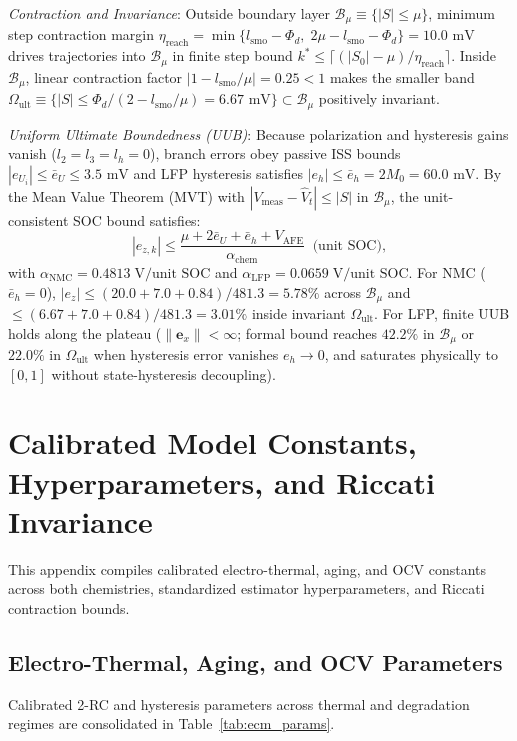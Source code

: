 \documentclass[11pt,a4paper]{article}
\begin{document}
\emph{Contraction and Invariance}: Outside boundary layer $\mathcal{B}_\mu \equiv \{|S| \le \mu\}$, minimum step contraction margin $\eta_{\text{reach}} = \min\{l_{\text{smo}} - \Phi_d,\; 2\mu - l_{\text{smo}} - \Phi_d\} = 10.0\text{ mV}$ drives trajectories into $\mathcal{B}_\mu$ in finite step bound $k^* \le \lceil (|S_0| - \mu)/\eta_{\text{reach}} \rceil$. Inside $\mathcal{B}_\mu$, linear contraction factor $|1 - l_{\text{smo}}/\mu| = 0.25 < 1$ makes the smaller band $\Omega_{\text{ult}} \equiv \{|S| \le \Phi_d/(2 - l_{\text{smo}}/\mu) = 6.67\text{ mV}\} \subset \mathcal{B}_\mu$ positively invariant.

\emph{Uniform Ultimate Boundedness (UUB)}: Because polarization and hysteresis gains vanish ($l_2 = l_3 = l_h = 0$), branch errors obey passive ISS bounds $|e_{U_i}| \le \bar{e}_U \le 3.5\text{ mV}$ and LFP hysteresis satisfies $|e_h| \le \bar{e}_h = 2 M_0 = 60.0\text{ mV}$. By the Mean Value Theorem (MVT) with $|V_{\text{meas}} - \hat{V}_t| \le |S|$ in $\mathcal{B}_\mu$, the unit-consistent SOC bound satisfies:
\begin{equation*}
|e_{z,k}| \le \frac{\mu + 2\bar{e}_U + \bar{e}_h + V_{\text{AFE}}}{\alpha_{\text{chem}}}\;\;\text{(unit SOC)},
\end{equation*}
with $\alpha_{\text{NMC}} = 0.4813\;\mathrm{V}/\text{unit SOC}$ and $\alpha_{\text{LFP}} = 0.0659\;\mathrm{V}/\text{unit SOC}$. For NMC ($\bar{e}_h = 0$), $|e_z| \le (20.0 + 7.0 + 0.84)/481.3 = 5.78\%$ across $\mathcal{B}_\mu$ and $\le (6.67 + 7.0 + 0.84)/481.3 = 3.01\%$ inside invariant $\Omega_{\text{ult}}$. For LFP, finite UUB holds along the plateau ($\|\mathbf{e}_x\| < \infty$; formal bound reaches $42.2\%$ in $\mathcal{B}_\mu$ or $22.0\%$ in $\Omega_{\text{ult}}$ when hysteresis error vanishes $e_h \to 0$, and saturates physically to $[0, 1]$ without state-hysteresis decoupling).

\section{Calibrated Model Constants, Hyperparameters, and Riccati Invariance\label{app:parameters}}
This appendix compiles calibrated electro-thermal, aging, and OCV constants across both chemistries, standardized estimator hyperparameters, and Riccati contraction bounds.

\subsection{Electro-Thermal, Aging, and OCV Parameters}
Calibrated 2-RC and hysteresis parameters across thermal and degradation regimes are consolidated in Table~\ref{tab:ecm_params}.
\end{document}
